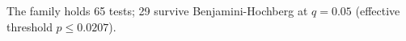 The family holds 65 tests; 29 survive Benjamini-Hochberg at $q = 0.05$ (effective threshold $p \le 0.0207$).
